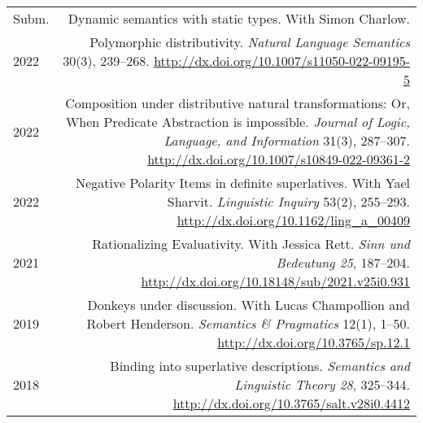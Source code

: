 \documentclass[12pt]{article}
\renewcommand{\arraystretch}{1.25} %
\newcommand{\doi}[1]{\url{http://dx.doi.org/#1}}
\newcommand{\refmark}{\textcolor{gray}{}}
\newcommand{\flag}{\llap{\refmark~~}}
\begin{document}
\begingroup
\renewcommand{\arraystretch}{1.5} %
\begin{longtable}{LR}
  Subm. & Dynamic semantics with static types.\newline
          With Simon Charlow.\\
  \flag%
  2022  & Polymorphic distributivity.\newline
          \textit{Natural Language Semantics} 30(3), 239--268.\newline
          \doi{10.1007/s11050-022-09195-5}\\
  \flag%
  2022  & Composition under distributive natural transformations: Or, When
          Predicate Abstraction is impossible.\newline
          \textit{Journal of Logic, Language, and Information} 31(3), 287--307.\newline
          \doi{10.1007/s10849-022-09361-2}\\
  \flag%
  2022  & Negative Polarity Items in definite superlatives.\newline
          With Yael Sharvit.\newline
          \textit{Linguistic Inquiry} 53(2), 255--293.\newline
          \doi{10.1162/ling_a_00409}\\
  2021  & Rationalizing Evaluativity.\newline
          With Jessica Rett.\newline
          \textit{Sinn und Bedeutung 25}, 187--204.\newline
          \doi{10.18148/sub/2021.v25i0.931}\\
  \flag%
  2019  & Donkeys under discussion.\newline
          With Lucas Champollion and Robert Henderson.\newline
          \textit{Semantics \& Pragmatics} 12(1), 1--50.\newline
          \doi{10.3765/sp.12.1}\\
  2018  & Binding into superlative descriptions.\newline
          \textit{Semantics and Linguistic Theory 28}, 325--344.\newline
          \doi{10.3765/salt.v28i0.4412}\\

\end{longtable}
\end{document}
